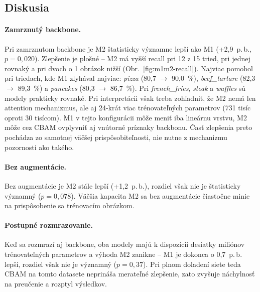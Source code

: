 


\subsection{Diskusia}

\paragraph{Zamrznutý backbone.} Pri zamrznutom backbone je M2 štatisticky
významne lepší ako M1 (+2,9~p.\,b., $p = 0{,}020$). Zlepšenie je plošné --
M2 má vyšší recall pri 12 z 15 tried, pri jednej rovnaký a pri dvoch o 1 obrázok nižší
(Obr.~\ref{fig:m1m2-recall}). Najviac pomohol pri triedach, kde M1 zlyhával
najviac: \emph{pizza} (80,7 $\rightarrow$ 90,0~\%), \emph{beef\_tartare}
(82,3 $\rightarrow$ 89,3~\%) a \emph{pancakes} (80,3 $\rightarrow$ 86,7~\%).
Pri \emph{french\_fries}, \emph{steak} a \emph{waffles} sú modely prakticky
rovnaké. Pri interpretácii však treba zohľadniť, že M2 nemá len
attention mechanizmus, ale aj 24-krát viac trénovateľných parametrov
(731 tisíc oproti 30 tisícom). M1 v tejto konfigurácii môže meniť iba
lineárnu vrstvu, M2 môže cez CBAM ovplyvniť aj vnútorné príznaky backbonu.
Časť zlepšenia preto pochádza zo samotnej väčšej prispôsobiteľnosti, nie
nutne z mechanizmu pozornosti ako takého.

\paragraph{Bez augmentácie.} Bez augmentácie je M2 stále lepší
(+1,2~p.\,b.), rozdiel však nie je štatisticky významný ($p = 0{,}078$).
Väčšia kapacita M2 sa bez augmentácie čiastočne minie na prispôsobenie sa
trénovacím obrázkom.

\paragraph{Postupné rozmrazovanie.} Keď sa rozmrazí aj backbone, oba modely
majú k dispozícii desiatky miliónov trénovateľných parametrov a výhoda
M2 zanikne -- M1 je dokonca o 0,7~p.\,b. lepší, rozdiel však nie je
významný ($p = 0{,}37$). Pri plnom doladení siete teda CBAM na tomto
datasete neprináša merateľné zlepšenie, zato zvyšuje náchylnosť na
preučenie a rozptyl výsledkov.

